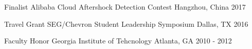 \begin{cvhonors}

  \cvhonor
    {Finalist} %
    {Alibaba Cloud Aftershock Detection Contest} %
    {Hangzhou, China} %
    {2017} %

  \cvhonor
    {Travel Grant} %
    {SEG/Chevron Student Leadership Symposium} %
    {Dallas, TX} %
    {2016} %

  \cvhonor
    {Faculty Honor} %
    {Georgia Institute of Tehcnology} %
    {Atlanta, GA} %
    {2010 - 2012} %

    


\end{cvhonors}

